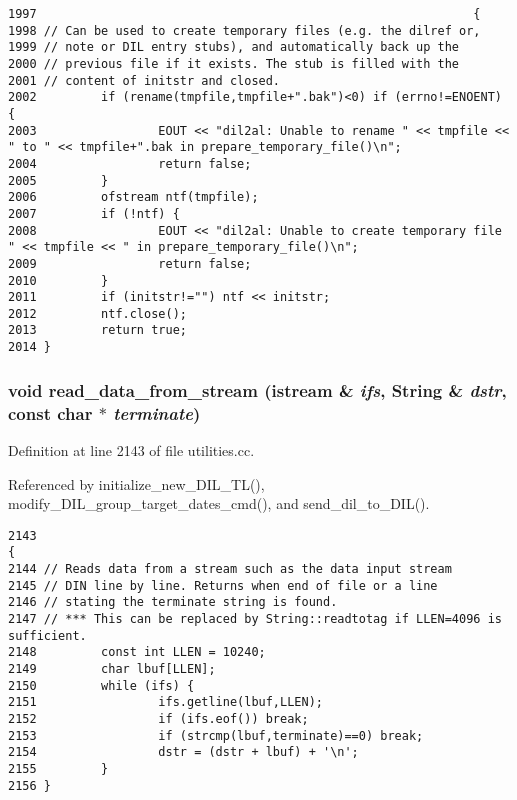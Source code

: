 \footnotesize\begin{verbatim}1997                                                             {
1998 // Can be used to create temporary files (e.g. the dilref or,
1999 // note or DIL entry stubs), and automatically back up the
2000 // previous file if it exists. The stub is filled with the
2001 // content of initstr and closed.
2002         if (rename(tmpfile,tmpfile+".bak")<0) if (errno!=ENOENT) {
2003                 EOUT << "dil2al: Unable to rename " << tmpfile << " to " << tmpfile+".bak in prepare_temporary_file()\n";
2004                 return false;
2005         }
2006         ofstream ntf(tmpfile);
2007         if (!ntf) {
2008                 EOUT << "dil2al: Unable to create temporary file " << tmpfile << " in prepare_temporary_file()\n";
2009                 return false;
2010         }
2011         if (initstr!="") ntf << initstr;
2012         ntf.close();
2013         return true;
2014 }
\end{verbatim}\normalsize 
{}
\subsubsection{\setlength{\rightskip}{0pt plus 5cm}void read\_\-data\_\-from\_\-stream (istream \& {\em ifs}, {\bf String} \& {\em dstr}, const char $\ast$ {\em terminate})}\label{utilities_8cc_a42}




Definition at line 2143 of file utilities.cc.

Referenced by initialize\_\-new\_\-DIL\_\-TL(), modify\_\-DIL\_\-group\_\-target\_\-dates\_\-cmd(), and send\_\-dil\_\-to\_\-DIL().



\footnotesize\begin{verbatim}2143                                                                                  {
2144 // Reads data from a stream such as the data input stream
2145 // DIN line by line. Returns when end of file or a line
2146 // stating the terminate string is found.
2147 // *** This can be replaced by String::readtotag if LLEN=4096 is sufficient.
2148         const int LLEN = 10240;
2149         char lbuf[LLEN];
2150         while (ifs) {
2151                 ifs.getline(lbuf,LLEN);
2152                 if (ifs.eof()) break;
2153                 if (strcmp(lbuf,terminate)==0) break;
2154                 dstr = (dstr + lbuf) + '\n';
2155         }
2156 }
\end{verbatim}\normalsize 
{}
